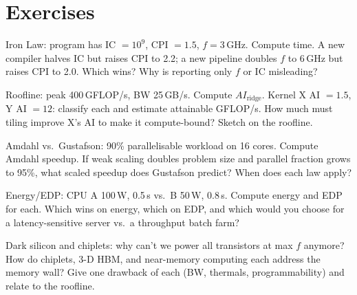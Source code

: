 \section{Exercises}
\begin{exercise}Iron Law: program has IC $=10^9$, CPI $=1.5$, $f=3$\,GHz. Compute time. A new compiler halves IC but raises CPI to 2.2; a new pipeline doubles $f$ to 6\,GHz but raises CPI to 2.0. Which wins? Why is reporting only $f$ or IC misleading?\end{exercise}
\begin{exercise}Roofline: peak 400\,GFLOP/s, BW 25\,GB/s. Compute $AI_{\text{ridge}}$. Kernel X AI $=1.5$, Y AI $=12$: classify each and estimate attainable GFLOP/s. How much must tiling improve X's AI to make it compute-bound? Sketch on the roofline.\end{exercise}
\begin{exercise}Amdahl vs.\ Gustafson: 90\% parallelisable workload on 16 cores. Compute Amdahl speedup. If weak scaling doubles problem size and parallel fraction grows to 95\%, what scaled speedup does Gustafson predict? When does each law apply?\end{exercise}
\begin{exercise}Energy/EDP: CPU A 100\,W, 0.5\,s vs.\ B 50\,W, 0.8\,s. Compute energy and EDP for each. Which wins on energy, which on EDP, and which would you choose for a latency-sensitive server vs.\ a throughput batch farm?\end{exercise}
\begin{exercise}Dark silicon and chiplets: why can't we power all transistors at max $f$ anymore? How do chiplets, 3-D HBM, and near-memory computing each address the memory wall? Give one drawback of each (BW, thermals, programmability) and relate to the roofline.\end{exercise}
